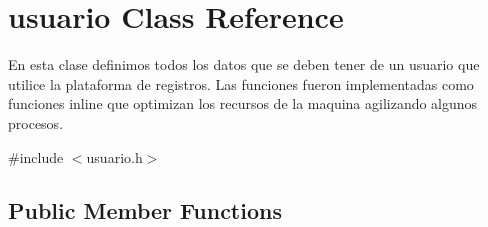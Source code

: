 \hypertarget{classusuario}{}\section{usuario Class Reference}
\label{classusuario}


En esta clase definimos todos los datos que se deben tener de un usuario que utilice la plataforma de registros. Las funciones fueron implementadas como funciones inline que optimizan los recursos de la maquina agilizando algunos procesos.  




{\ttfamily \#include $<$usuario.\+h$>$}

\subsection*{Public Member Functions}
